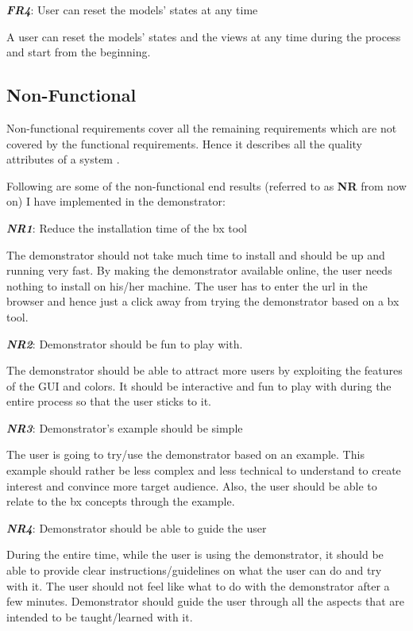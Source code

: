 \textbf{\textit{FR4}}: User can reset the models' states at any time

A user can reset the models' states and the views at any time during the process and start from the beginning.

\subsection{Non-Functional}\label{subsec:nonfunctionalreq}
Non-functional requirements cover all the remaining requirements which are not covered by the functional requirements. Hence it describes all the quality attributes of a system \cite{funcandnonfuncreq}.

Following are some of the non-functional end results (referred to as \textbf{NR} from now on) I have implemented in the demonstrator:

\textbf{\textit{NR1}}: Reduce the installation time of the bx tool

The demonstrator should not take much time to install and should be up and running very fast. By making the demonstrator available online, the user needs nothing to install on his/her machine. The user has to enter the url in the browser and hence just a click away from trying the demonstrator based on a bx tool.

\textbf{\textit{NR2}}: Demonstrator should be fun to play with.

The demonstrator should be able to attract more users by exploiting the features of the GUI and colors. It should be interactive and fun to play with during the entire process so that the user sticks to it.

\textbf{\textit{NR3}}: Demonstrator's example should be simple

The user is going to try/use the demonstrator based on an example. This example should rather be less complex and less technical to understand to create interest and convince more target audience. Also, the user should be able to relate to the bx concepts through the example.

\textbf{\textit{NR4}}: Demonstrator should be able to guide the user

During the entire time, while the user is using the demonstrator, it should be able to provide clear instructions/guidelines on what the user can do and try with it. The user should not feel like what to do with the demonstrator after a few minutes. Demonstrator should guide the user through all the aspects that are intended to be taught/learned with it.

